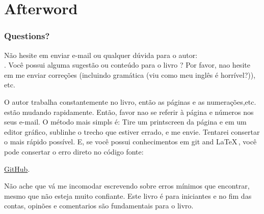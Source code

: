 \part*{Afterword}

\section{Questions?}

Não hesite em enviar e-mail ou qualquer dúvida para o autor: \\
\GTT{<\EMAIL>}.
Você possui alguma sugestão ou conteúdo para o livro ?
Por favor, nao hesite em me enviar correções (incluindo gramática (viu como meu inglês é horrível?)), etc.

O autor trabalha constantemente no livro, então as páginas e as numerações,etc. estão mudando rapidamente.
Então, favor nao se referir à página e números nos seus e-mail. O método mais simpls é: Tire um printscreen da página e em um editor gráfico, sublinhe o trecho que estiver errado, e me envie. Tentarei consertar o mais rápido possível.
E, se você possui conhecimentos em git and \LaTeX\,, você pode consertar o erro direto no código fonte:


\href{http://go.yurichev.com/17089}{GitHub}.

Não ache que vá me incomodar escrevendo sobre erros mínimos que encontrar, mesmo que não esteja muito confiante.
Este livro é para iniciantes e no fim das contas, opinões e comentarios são fundamentais para o livro.